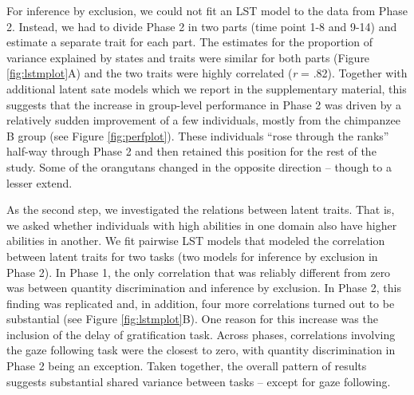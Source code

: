 \documentclass[
  man,floatsintext]{apa6}
\begin{document}
For inference by exclusion, we could not fit an LST model to the data from Phase 2. Instead, we had to divide Phase 2 in two parts (time point 1-8 and 9-14) and estimate a separate trait for each part. The estimates for the proportion of variance explained by states and traits were similar for both parts (Figure \ref{fig:lstmplot}A) and the two traits were highly correlated (\emph{r} = .82). Together with additional latent sate models which we report in the supplementary material, this suggests that the increase in group-level performance in Phase 2 was driven by a relatively sudden improvement of a few individuals, mostly from the chimpanzee B group (see Figure \ref{fig:perfplot}). These individuals ``rose through the ranks'' half-way through Phase 2 and then retained this position for the rest of the study. Some of the orangutans changed in the opposite direction -- though to a lesser extend.

As the second step, we investigated the relations between latent traits. That is, we asked whether individuals with high abilities in one domain also have higher abilities in another. We fit pairwise LST models that modeled the correlation between latent traits for two tasks (two models for inference by exclusion in Phase 2). In Phase 1, the only correlation that was reliably different from zero was between quantity discrimination and inference by exclusion. In Phase 2, this finding was replicated and, in addition, four more correlations turned out to be substantial (see Figure \ref{fig:lstmplot}B). One reason for this increase was the inclusion of the delay of gratification task. Across phases, correlations involving the gaze following task were the closest to zero, with quantity discrimination in Phase 2 being an exception. Taken together, the overall pattern of results suggests substantial shared variance between tasks -- except for gaze following.
\end{document}
